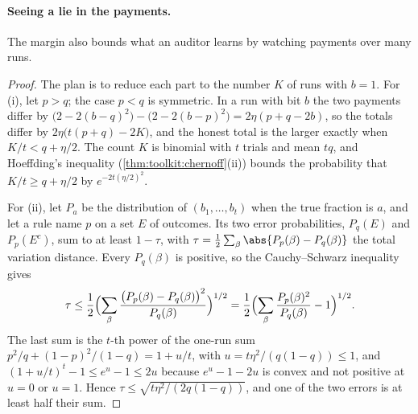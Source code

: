 \begin{refsection}
\paragraph{Seeing a lie in the payments.} The margin also bounds what an auditor learns by watching payments over many runs.


\begin{proof}
The plan is to reduce each part to the number $K$ of runs with $b=1$. For (i), let $p>q$; the case $p<q$ is symmetric. In a run with bit $b$ the two payments differ by $\bigl(2-2(b-q)^2\bigr)-\bigl(2-2(b-p)^2\bigr)=2\eta(p+q-2b)$, so the totals differ by $2\eta\bigl(t(p+q)-2K\bigr)$, and the honest total is the larger exactly when $K/t<q+\eta/2$. The count $K$ is binomial with $t$ trials and mean $tq$, and Hoeffding's inequality (\cref{thm:toolkit:chernoff}(ii)) bounds the probability that $K/t\ge q+\eta/2$ by $e^{-2t(\eta/2)^2}$.

For (ii), let $P_a$ be the distribution of $(b_1,\dots,b_t)$ when the true fraction is $a$, and let a rule name $p$ on a set $E$ of outcomes. Its two error probabilities, $P_q(E)$ and $P_p(E^c)$, sum to at least $1-\tau$, with $\tau=\frac12\sum_\beta\abs{P_p(\beta)-P_q(\beta)}$ the total variation distance. Every $P_q(\beta)$ is positive, so the Cauchy--Schwarz inequality gives
\[
\tau\le\frac12\Bigl(\sum_\beta\frac{\bigl(P_p(\beta)-P_q(\beta)\bigr)^2}{P_q(\beta)}\Bigr)^{1/2}=\frac12\Bigl(\sum_\beta\frac{P_p(\beta)^2}{P_q(\beta)}-1\Bigr)^{1/2}.
\]
The last sum is the $t$-th power of the one-run sum $p^2/q+(1-p)^2/(1-q)=1+u/t$, with $u=t\eta^2/(q(1-q))\le1$, and $(1+u/t)^t-1\le e^u-1\le2u$ because $e^u-1-2u$ is convex and not positive at $u=0$ or $u=1$. Hence $\tau\le\sqrt{t\eta^2/(2q(1-q))}$, and one of the two errors is at least half their sum.
\end{proof}


\end{refsection}

